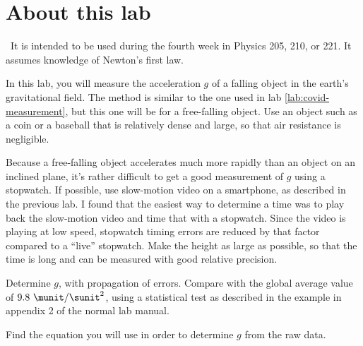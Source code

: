 \addtocounter{chapter}{-1}
\renewcommand\thechapter{c1.3a}
\label{lab:covid-g}

\section*{About this lab}

\covid\ 
It is intended to be used during the fourth week in Physics 205, 210, or 221.
It assumes knowledge of Newton's first law.

\observations

In this lab, you will measure the acceleration $g$ of a falling object in the earth's
gravitational field. The method is similar to the one used in lab \ref{lab:covid-measurement},
but this one will be for a free-falling object. Use an object such as a coin or a baseball
that is relatively dense and large, so that air resistance is negligible.

Because a free-falling object accelerates much more rapidly than an object on an inclined
plane, it's rather difficult to get a good measurement of $g$ using a stopwatch. If possible,
use slow-motion video on a smartphone, as described in the previous lab. I found that the
easiest way to determine a time was to play back the slow-motion video and time that with
a stopwatch. Since the video is playing at low speed, stopwatch timing errors are reduced
by that factor compared to a ``live'' stopwatch. Make the height as
large as possible, so that the time is long and can be measured with good relative precision.


\analysis

Determine $g$, with propagation of errors. Compare with the global average value of $9.8\ \munit/\sunit^2$,
using a statistical test as described in the example in appendix 2 of the normal lab manual.

\prelab

\prelabquestion  
Find the equation you will use in order to determine $g$ from the raw data.




